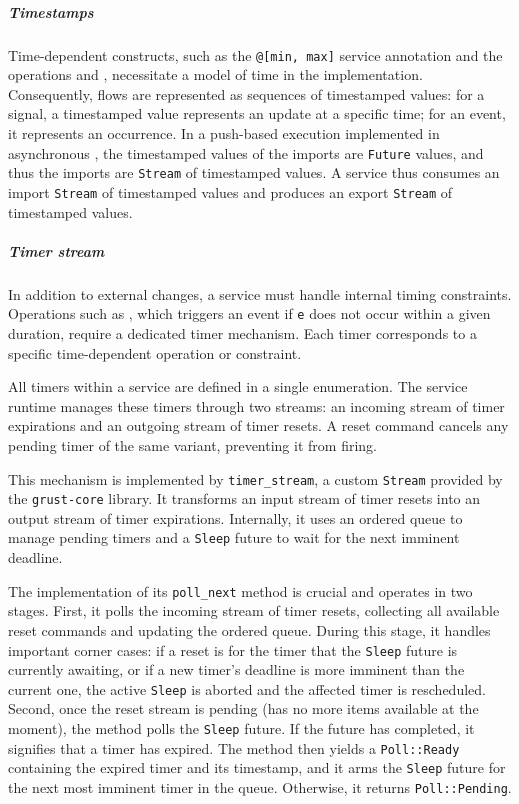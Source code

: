 \subparagraph{Timestamps}
Time-dependent constructs, such as the \texttt{@[min, max]} service annotation and the \GReact
operations  and , necessitate a model of time in the implementation.
Consequently, flows are represented as sequences of timestamped values: for a signal, a timestamped
value represents an update at a specific time; for an event, it represents an occurrence.
%
In a push-based execution implemented in asynchronous \Rust, the timestamped values of the imports
are \texttt{Future} values, and thus the imports are \texttt{Stream} of timestamped values.
%
A service thus consumes an import \texttt{Stream} of timestamped values and produces an export
\texttt{Stream} of timestamped values.

\subparagraph{Timer stream}
In addition to external changes, a service must handle internal timing constraints. Operations such
as , which triggers an event if \texttt{e} does not occur within a given
duration, require a dedicated timer mechanism. Each timer corresponds to a specific time-dependent
operation or constraint.

All timers within a service are defined in a single enumeration. The service runtime manages these
timers through two streams: an incoming stream of timer expirations and an outgoing stream of timer
resets. A reset command cancels any pending timer of the same variant, preventing it from firing.

This mechanism is implemented by \texttt{timer\_stream}, a custom \Rust \texttt{Stream} provided by
the \texttt{grust-core} library. It transforms an input stream of timer resets into an output stream
of timer expirations. Internally, it uses an ordered queue to manage pending timers and a
\texttt{Sleep} future to wait for the next imminent deadline.

The implementation of its \texttt{poll\_next} method is crucial and operates in two stages. First,
it polls the incoming stream of timer resets, collecting all available reset commands and updating
the ordered queue. During this stage, it handles important corner cases: if a reset is for the timer
that the \texttt{Sleep} future is currently awaiting, or if a new timer's deadline is more imminent
than the current one, the active \texttt{Sleep} is aborted and the affected timer is rescheduled.
Second, once the reset stream is pending (\ie has no more items available at the moment), the method
polls the \texttt{Sleep} future. If the future has completed, it signifies that a timer has expired.
The method then yields a \texttt{Poll::Ready} containing the expired timer and its timestamp, and it
arms the \texttt{Sleep} future for the next most imminent timer in the queue. Otherwise, it returns
\texttt{Poll::Pending}.

